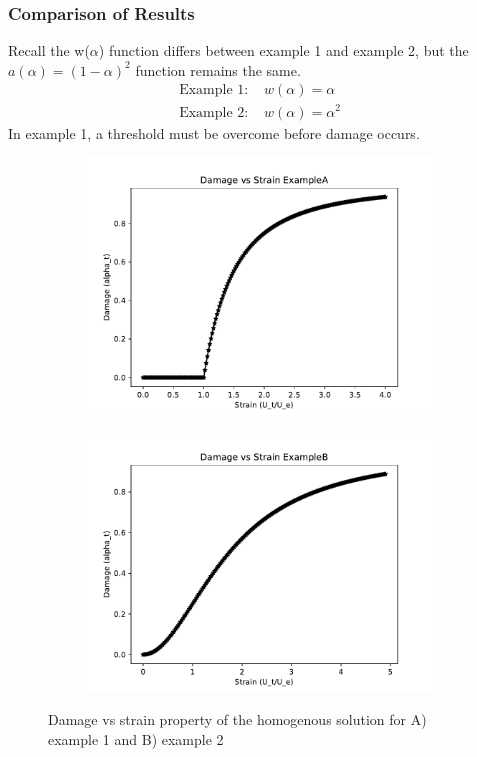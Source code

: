 \documentclass[12pt,3p]{article}
\numberwithin{equation}{section}
\begin{document}
\subsubsection{Comparison of Results}
Recall the w($\alpha$) function differs between example 1 and example 2, but the $a (\alpha) = (1 - \alpha)^2$ function remains the same. 
\begin{align*}
\text{Example 1: }& w(\alpha) = \alpha \\
\text{Example 2: }& w(\alpha) = \alpha^2
\end{align*}
In example 1, a threshold must be overcome before damage occurs. 
\begin{figure}[h]
    \centering
    \begin{subfigure}[b]{0.45\textwidth}
        \includegraphics[width=\textwidth]{Images/A_damage_strain_dim.pdf}
    \end{subfigure}
    \quad %
    \begin{subfigure}[b]{0.45\textwidth}
        \includegraphics[width=\textwidth]{Images/B_damage_strain_dim.pdf}
    \end{subfigure}
    \caption{Damage vs strain property of the homogenous solution for A) example 1 and B) example 2}
\end{figure}
\end{document}
